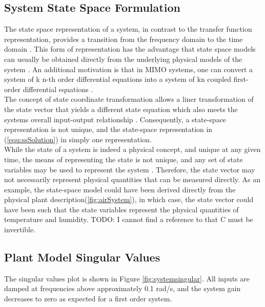 \documentclass[a4paper, titlepage]{article}
\begin{document}
\subsection{System State Space Formulation}
   
The state space representation of a system, in contrast to the transfer function representation, provides a transition from the frequency domain to the time domain \citep [p. 3]{williams07}.  This form of representation has the advantage that state space models can usually be obtained directly from the underlying physical models of the system \citep[p.~32]{glad00}.  An additional motivation is that in MIMO systems, one can convert a system of k n-th order differential equations into a system of kn coupled first-order differential equations \citep[p.~5]{williams07}.\\

The concept of state coordinate transformation allows a liner transformation of the state vector that yields a different state equation which also meets the systems overall input-output relationship \citep[p.~72]{williams07}.  Consequently, a state-space representation is not unique, and the state-space representation in (\ref{equ:ssSolution}) in simply one representation.\\

While the state of a system is indeed a physical concept, and unique at any given time, the means of representing the state is not unique, and any set of state variables may be used to represent the system \cite [p. 43]{melsa69}.  Therefore, the state vector may not necessarily represent physical quantities that can be measured directly. As an example, the state-space model could have been derived directly from the physical plant description(\ref{fig:airSystem}), in which case, the state vector could have been such that the state variables represent the physical quantities of temperature and humidity. 
TODO: I cannot find a reference to that C must be invertible.\\

\subsection{Plant Model Singular Values}

The singular values plot is shown in Figure \ref{fig:systemsingular}.  All inputs are damped at frequencies above approximately 0.1 rad/s, and the system gain decreases to zero as expected for a first order system.
\end{document}
